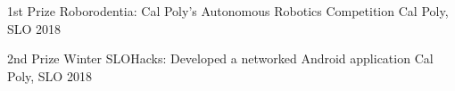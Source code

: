 



\begin{cvhonors}

  \cvhonor
    {1st Prize} %
    {Roborodentia: Cal Poly's Autonomous Robotics Competition} %
    {Cal Poly, SLO} %
    {2018} %

  \cvhonor
    {2nd Prize} %
    {Winter SLOHacks: Developed a networked Android application} %
    {Cal Poly, SLO} %
    {2018} %

\end{cvhonors}








